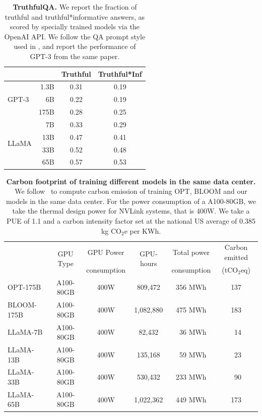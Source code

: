 \documentclass[11pt]{article}
\newcommand{\model}{LLaMA\xspace}
\begin{document}
\begin{table}[t]
  \center
  \begin{tabular}{@{}lr  cc@{}}
  \toprule
            &       & Truthful & Truthful*Inf \\ 
  \midrule
  \multirow{3}{*}{GPT-3}
                & 1.3B  & 0.31 & 0.19 \\
                & 6B    & 0.22 & 0.19 \\
                & 175B  & 0.28 & 0.25 \\
  \midrule
  \multirow{4}{*}{\model}
                & 7B  & 0.33 & 0.29 \\
                & 13B & 0.47 & 0.41 \\
                & 33B & 0.52 & 0.48 \\
                & 65B & 0.57 & 0.53 \\
  \bottomrule
  \end{tabular}
  \caption{\textbf{TruthfulQA.} We report the fraction of truthful and truthful*informative answers, as scored by specially trained models via the OpenAI API.  We follow the QA prompt style used in \citet{ouyang2022training}, and report the performance of GPT-3 from the same paper.
  }
  \label{tab:TuthfulQA}
\end{table}

\begin{table}[t]
    \centering
    \begin{tabular}{l ccccc}
    \toprule
         & \multirow{2}{*}{GPU Type} & GPU Power &  \multirow{2}{*}{GPU-hours} & Total power  & Carbon emitted\\
         &  & consumption &       &  consumption & (tCO$_2$eq)\\
\midrule
OPT-175B    & A100-80GB & 400W & 809,472 & 356 MWh & 137 \\
BLOOM-175B  & A100-80GB & 400W & 1,082,880 & 475 MWh & 183\\
\midrule
\model-7B   & A100-80GB & 400W & 82,432 & ~36 MWh & ~14 \\
\model-13B  & A100-80GB & 400W & 135,168 & ~59 MWh & ~23 \\
\model-33B  & A100-80GB & 400W & 530,432 & 233 MWh & ~90 \\
\model-65B & A100-80GB & 400W & 1,022,362 & 449 MWh & 173 \\       
     \bottomrule
    \end{tabular}
    \caption{
    \textbf{Carbon footprint of training different models in the same data center.}
    We follow~\citet{wu2022sustainable} to compute carbon emission of training OPT, BLOOM and our models in the same data center. For the power consumption of a A100-80GB, we take the thermal design power for NVLink systems, that is 400W. We take a PUE of 1.1 and a carbon intensity factor set at the national US average of 0.385 kg CO$_2$e per KWh.
    \label{tab:cf}
    \vspace{-0.5em}
    }
\end{table}
\end{document}
